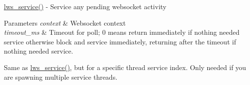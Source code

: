 \hyperlink{group__service_gaf95bd0c663d6516a0c80047d9b1167a8}{lws\+\_\+service()} -\/ Service any pending websocket activity


\begin{DoxyParams}{Parameters}
{\em context} & Websocket context \\
\hline
{\em timeout\+\_\+ms} & Timeout for poll; 0 means return immediately if nothing needed service otherwise block and service immediately, returning after the timeout if nothing needed service.\\
\hline
\end{DoxyParams}
Same as \hyperlink{group__service_gaf95bd0c663d6516a0c80047d9b1167a8}{lws\+\_\+service()}, but for a specific thread service index. Only needed if you are spawning multiple service threads. 